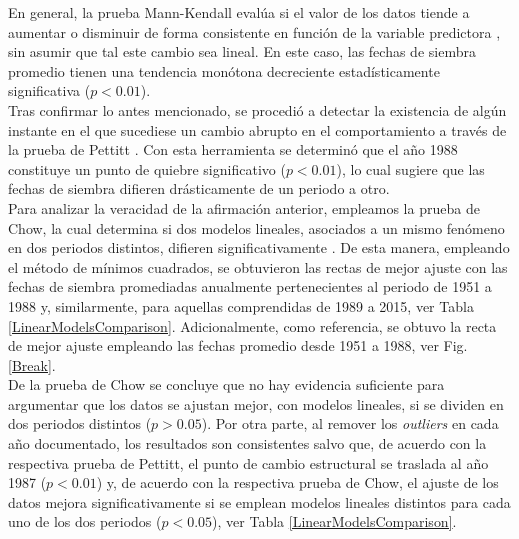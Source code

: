 En general, la prueba Mann-Kendall evalúa si el valor de los datos tiende a aumentar o disminuir de forma consistente en función de la variable predictora \citep{Yue_2002}, sin asumir que tal este cambio sea lineal. En este caso, las fechas de siembra promedio tienen una tendencia monótona decreciente estadísticamente significativa ($p<0.01$).\\

Tras confirmar lo antes mencionado, se procedió a detectar la existencia de algún instante en el que sucediese un cambio abrupto en el comportamiento a través de la prueba de Pettitt \citep{Kundzewicz_2004}. Con esta herramienta se determinó que el año 1988 constituye un punto de quiebre significativo ($p<0.01$), lo cual sugiere que las fechas de siembra difieren drásticamente de un periodo a otro.\\

Para analizar la veracidad de la afirmación anterior, empleamos la prueba de Chow, la cual determina si dos modelos lineales, asociados a un mismo fenómeno en dos periodos distintos, difieren significativamente \citep{Chow_1960, Rapach_2006}. De esta manera, empleando el método de mínimos cuadrados, se obtuvieron las rectas de mejor ajuste con las fechas de siembra promediadas anualmente pertenecientes al periodo de 1951 a 1988 y, similarmente, para aquellas comprendidas de 1989 a 2015, ver Tabla \ref{LinearModelsComparison}. Adicionalmente, como referencia, se obtuvo la recta de mejor ajuste empleando las fechas promedio desde 1951 a 1988, ver Fig. \ref{Break}.\\

De la prueba de Chow se concluye que no hay evidencia suficiente para argumentar que los datos se ajustan mejor, con modelos lineales, si se dividen en dos periodos distintos ($p>0.05$). Por otra parte, al remover los \textit{outliers} en cada año documentado, los resultados son consistentes salvo que, de acuerdo con la respectiva prueba de Pettitt, el punto de cambio estructural se traslada al año 1987 ($p<0.01$) y, de acuerdo con la respectiva prueba de Chow, el ajuste de los datos mejora significativamente si se emplean modelos lineales distintos para cada uno de los dos periodos ($p<0.05$), ver Tabla \ref{LinearModelsComparison}.\\

